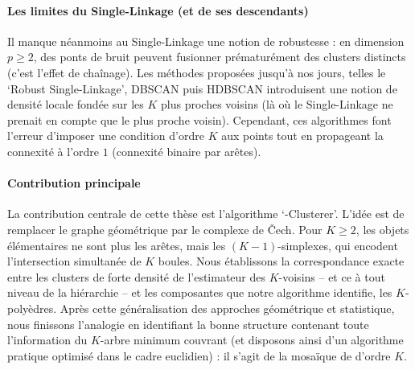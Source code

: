 \begin{AbstractPage}
\begin{resume}
\paragraph{Les limites du Single-Linkage (et de ses descendants)}
Il manque néanmoins au Single-Linkage une notion de robustesse : en dimension \(p\geq2\),  des ponts de bruit peuvent fusionner prématurément des clusters distincts (c'est l'effet de chaînage). Les méthodes proposées jusqu'à nos jours, telles le `Robust Single-Linkage', DBSCAN puis HDBSCAN introduisent une notion de densité locale fondée sur les \(K\) plus proches voisins (là où le Single-Linkage ne prenait en compte que le plus proche voisin).
Cependant, ces algorithmes font l'erreur d'imposer une condition d'ordre \(K\) aux points tout en propageant la connexité à l'ordre \(1\) (connexité binaire par arêtes). %

\paragraph{Contribution principale}
La contribution centrale de cette thèse est l'algorithme `\HGP-Clusterer'. L'idée est de remplacer le graphe géométrique par le complexe de \v{C}ech. Pour \(K\geq2\), les objets élémentaires ne sont plus les arêtes, mais les \((K-1)\)-simplexes, qui encodent l'intersection simultanée de \(K\) boules. %
Nous établissons la correspondance exacte entre les clusters de forte densité de l'estimateur des $K$-voisins -- et ce à tout niveau de la hiérarchie -- et les composantes que notre algorithme identifie, les \(K\)-polyèdres. 
Après cette généralisation des approches géométrique et statistique, nous finissons l'analogie en identifiant la bonne structure contenant toute l'information du $K$-arbre minimum couvrant (et disposons ainsi d'un algorithme pratique optimisé dans le cadre euclidien) : il s'agit de la mosaïque de  d'ordre $K$.




\end{resume}
\end{AbstractPage}
